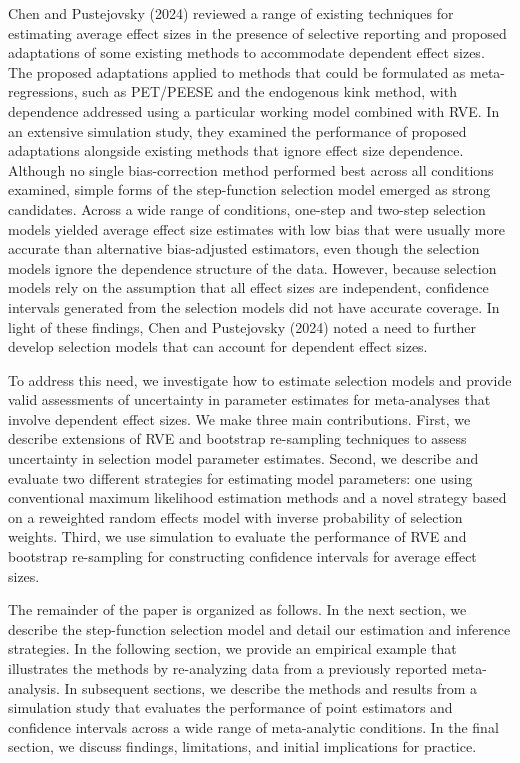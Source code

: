 \documentclass[
  american,
  man, donotrepeattitle,floatsintext]{apa7}
\begin{document}
Chen and Pustejovsky (2024) reviewed a range of existing techniques for estimating average effect sizes in the presence of selective reporting and proposed adaptations of some existing methods to accommodate dependent effect sizes.
The proposed adaptations applied to methods that could be formulated as meta-regressions, such as PET/PEESE and the endogenous kink method, with dependence addressed using a particular working model combined with RVE.
In an extensive simulation study, they examined the performance of proposed adaptations alongside existing methods that ignore effect size dependence.
Although no single bias-correction method performed best across all conditions examined, simple forms of the step-function selection model emerged as strong candidates.
Across a wide range of conditions, one-step and two-step selection models yielded average effect size estimates with low bias that were usually more accurate than alternative bias-adjusted estimators, even though the selection models ignore the dependence structure of the data.
However, because selection models rely on the assumption that all effect sizes are independent, confidence intervals generated from the selection models did not have accurate coverage.
In light of these findings, Chen and Pustejovsky (2024) noted a need to further develop selection models that can account for dependent effect sizes.

To address this need, we investigate how to estimate selection models and provide valid assessments of uncertainty in parameter estimates for meta-analyses that involve dependent effect sizes.
We make three main contributions.
First, we describe extensions of RVE and bootstrap re-sampling techniques to assess uncertainty in selection model parameter estimates.
Second, we describe and evaluate two different strategies for estimating model parameters: one using conventional maximum likelihood estimation methods and a novel strategy based on a reweighted random effects model with inverse probability of selection weights.
Third, we use simulation to evaluate the performance of RVE and bootstrap re-sampling for constructing confidence intervals for average effect sizes.

The remainder of the paper is organized as follows.
In the next section, we describe the step-function selection model and detail our estimation and inference strategies.
In the following section, we provide an empirical example that illustrates the methods by re-analyzing data from a previously reported meta-analysis.
In subsequent sections, we describe the methods and results from a simulation study that evaluates the performance of point estimators and confidence intervals across a wide range of meta-analytic conditions.
In the final section, we discuss findings, limitations, and initial implications for practice.
\end{document}
